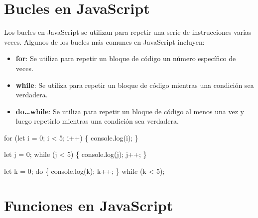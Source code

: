 \documentclass[
  a4paper,
  DIV=11,
  numbers=noendperiod,
  onepage,
  openany]{scrreprt}
\newenvironment{Shaded}{\begin{snugshade}}{\end{snugshade}}
\newcommand{\BuiltInTok}[1]{\textcolor[rgb]{0.00,0.23,0.31}{#1}}
\newcommand{\ControlFlowTok}[1]{\textcolor[rgb]{0.00,0.23,0.31}{#1}}
\newcommand{\DecValTok}[1]{\textcolor[rgb]{0.68,0.00,0.00}{#1}}
\newcommand{\FunctionTok}[1]{\textcolor[rgb]{0.28,0.35,0.67}{#1}}
\newcommand{\KeywordTok}[1]{\textcolor[rgb]{0.00,0.23,0.31}{#1}}
\newcommand{\NormalTok}[1]{\textcolor[rgb]{0.00,0.23,0.31}{#1}}
\newcommand{\OperatorTok}[1]{\textcolor[rgb]{0.37,0.37,0.37}{#1}}
\providecommand{\tightlist}{%
  \setlength{\itemsep}{0pt}\setlength{\parskip}{0pt}}\usepackage{longtable,booktabs,array}
\begin{document}
\section{Bucles en JavaScript}\label{bucles-en-javascript}

Los bucles en JavaScript se utilizan para repetir una serie de
instrucciones varias veces. Algunos de los bucles más comunes en
JavaScript incluyen:

\begin{itemize}
\tightlist
\item
  \textbf{for}: Se utiliza para repetir un bloque de código un número
  específico de veces.
\item
  \textbf{while}: Se utiliza para repetir un bloque de código mientras
  una condición sea verdadera.
\item
  \textbf{do\ldots while}: Se utiliza para repetir un bloque de código
  al menos una vez y luego repetirlo mientras una condición sea
  verdadera.
\end{itemize}

\begin{Shaded}
\begin{Highlighting}[]
\ControlFlowTok{for}\NormalTok{ (}\KeywordTok{let}\NormalTok{ i }\OperatorTok{=} \DecValTok{0}\OperatorTok{;}\NormalTok{ i }\OperatorTok{\textless{}} \DecValTok{5}\OperatorTok{;}\NormalTok{ i}\OperatorTok{++}\NormalTok{) \{}
    \BuiltInTok{console}\OperatorTok{.}\FunctionTok{log}\NormalTok{(i)}\OperatorTok{;}
\NormalTok{\}}

\KeywordTok{let}\NormalTok{ j }\OperatorTok{=} \DecValTok{0}\OperatorTok{;}
\ControlFlowTok{while}\NormalTok{ (j }\OperatorTok{\textless{}} \DecValTok{5}\NormalTok{) \{}
    \BuiltInTok{console}\OperatorTok{.}\FunctionTok{log}\NormalTok{(j)}\OperatorTok{;}
\NormalTok{    j}\OperatorTok{++;}
\NormalTok{\}}

\KeywordTok{let}\NormalTok{ k }\OperatorTok{=} \DecValTok{0}\OperatorTok{;}
\ControlFlowTok{do}\NormalTok{ \{}
    \BuiltInTok{console}\OperatorTok{.}\FunctionTok{log}\NormalTok{(k)}\OperatorTok{;}
\NormalTok{    k}\OperatorTok{++;}
\NormalTok{\} }\ControlFlowTok{while}\NormalTok{ (k }\OperatorTok{\textless{}} \DecValTok{5}\NormalTok{)}\OperatorTok{;}
\end{Highlighting}
\end{Shaded}

\section{Funciones en JavaScript}\label{funciones-en-javascript}
\end{document}
